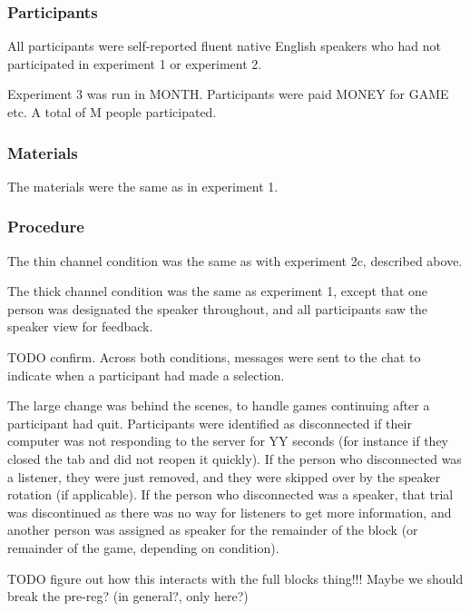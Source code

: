 \documentclass[
  english,
  a4paper,
]{article}
\begin{document}
\hypertarget{participants-2}{%
\subsubsection{Participants}\label{participants-2}}

All participants were self-reported fluent native English speakers who had not participated in experiment 1 or experiment 2.

Experiment 3 was run in MONTH. Participants were paid MONEY for GAME etc. A total of M people participated.

\hypertarget{materials-2}{%
\subsubsection{Materials}\label{materials-2}}

The materials were the same as in experiment 1.

\hypertarget{procedure-2}{%
\subsubsection{Procedure}\label{procedure-2}}

The thin channel condition was the same as with experiment 2c, described above.

The thick channel condition was the same as experiment 1, except that one person was designated the speaker throughout, and all participants saw the speaker view for feedback.

TODO confirm. Across both conditions, messages were sent to the chat to indicate when a participant had made a selection.

The large change was behind the scenes, to handle games continuing after a participant had quit. Participants were identified as disconnected if their computer was not responding to the server for YY seconds (for instance if they closed the tab and did not reopen it quickly). If the person who disconnected was a listener, they were just removed, and they were skipped over by the speaker rotation (if applicable). If the person who disconnected was a speaker, that trial was discontinued as there was no way for listeners to get more information, and another person was assigned as speaker for the remainder of the block (or remainder of the game, depending on condition).

TODO figure out how this interacts with the full blocks thing!!! Maybe we should break the pre-reg? (in general?, only here?)
\end{document}

